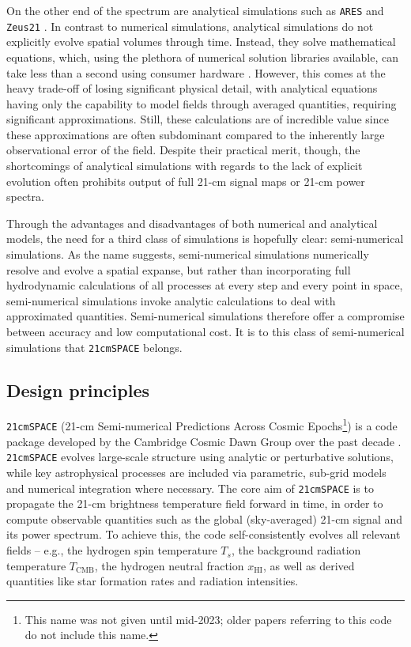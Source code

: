 \documentclass[floats,floatfix,showpacs,amssymb,prd,superscriptaddress,nofootinbib]{revtex4-2} %
\newcommand{\code}{\texttt}
\begin{document}
On the other end of the spectrum are analytical simulations such as \code{ARES} \citep{Mirocha_2014} and \code{Zeus21} \citep{Munoz_2023}. In contrast to numerical simulations, analytical simulations do not explicitly evolve spatial volumes through time. Instead, they solve mathematical equations, which, using the plethora of numerical solution libraries available, can take less than a second using consumer hardware \citep{gessey-jones_thesis}. However, this comes at the heavy trade-off of losing significant physical detail, with analytical equations having only the capability to model fields through averaged quantities, requiring significant approximations. Still, these calculations are of incredible value since these approximations are often subdominant compared to the inherently large observational error of the field. Despite their practical merit, though, the shortcomings of analytical simulations with regards to the lack of explicit evolution often prohibits output of full 21-cm signal maps or 21-cm power spectra.

Through the advantages and disadvantages of both numerical and analytical models, the need for a third class of simulations is hopefully clear: semi-numerical simulations. As the name suggests, semi-numerical simulations numerically resolve and evolve a spatial expanse, but rather than incorporating full hydrodynamic calculations of all processes at every step and every point in space, semi-numerical simulations invoke analytic calculations to deal with approximated quantities. Semi-numerical simulations therefore offer a compromise between accuracy and low computational cost. It is to this class of semi-numerical simulations that \code{21cmSPACE} belongs.


\subsection{Design principles}
\code{21cmSPACE} (21-cm Semi-numerical Predictions Across Cosmic Epochs\footnote{This name was not given until mid-2023; older papers referring to this code do not include this name.}) is a code package developed by the Cambridge Cosmic Dawn Group over the past decade \citep{Fialkov_2012, Visbal_2012}. \code{21cmSPACE} evolves large-scale structure using analytic or perturbative solutions, while key astrophysical processes are included via parametric, sub-grid models and numerical integration where necessary. The core aim of \code{21cmSPACE} is to propagate the 21-cm brightness temperature field forward in time, in order to compute observable quantities such as the global (sky-averaged) 21-cm signal and its power spectrum. To achieve this, the code self-consistently evolves all relevant fields -- e.g., the hydrogen spin temperature $T_s$, the background radiation temperature $T_{\text{CMB}}$, the hydrogen neutral fraction $x_{\text{HI}}$, as well as derived quantities like star formation rates and radiation intensities.
\end{document}
